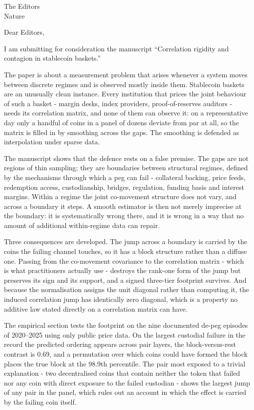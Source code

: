\documentclass[11pt]{letter}
\begin{document}
\begin{letter}{The Editors\\Nature}
\opening{Dear Editors,}

I am submitting for consideration the manuscript ``Correlation rigidity and contagion in stablecoin baskets.''

The paper is about a measurement problem that arises whenever a system moves between discrete regimes and is observed mostly inside them. Stablecoin baskets are an unusually clean instance. Every institution that prices the joint behaviour of such a basket - margin desks, index providers, proof-of-reserves auditors - needs its correlation matrix, and none of them can observe it: on a representative day only a handful of coins in a panel of dozens deviate from par at all, so the matrix is filled in by smoothing across the gaps. The smoothing is defended as interpolation under sparse data.

The manuscript shows that the defence rests on a false premise. The gaps are not regions of thin sampling; they are boundaries between structural regimes, defined by the mechanisms through which a peg can fail - collateral backing, price feeds, redemption access, custodianship, bridges, regulation, funding basis and interest margins. Within a regime the joint co-movement structure does not vary, and across a boundary it steps. A smooth estimator is then not merely imprecise at the boundary: it is systematically wrong there, and it is wrong in a way that no amount of additional within-regime data can repair.

Three consequences are developed. The jump across a boundary is carried by the coins the failing channel touches, so it has a block structure rather than a diffuse one. Passing from the co-movement covariance to the correlation matrix - which is what practitioners actually use - destroys the rank-one form of the jump but preserves its sign and its support, and a signed three-tier footprint survives. And because the normalisation assigns the unit diagonal rather than computing it, the induced correlation jump has identically zero diagonal, which is a property no additive law stated directly on a correlation matrix can have.

The empirical section tests the footprint on the nine documented de-peg episodes of 2020--2025 using only public price data. On the largest custodial failure in the record the predicted ordering appears across pair layers, the block-versus-rest contrast is 0.69, and a permutation over which coins could have formed the block places the true block at the 98.9th percentile. The pair most exposed to a trivial explanation - two decentralised coins that contain neither the token that failed nor any coin with direct exposure to the failed custodian - shows the largest jump of any pair in the panel, which rules out an account in which the effect is carried by the failing coin itself.


\end{letter}
\end{document}
